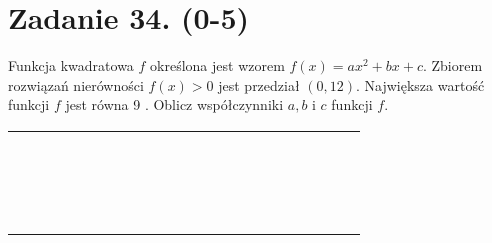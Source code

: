 \documentclass[10pt]{article}
\begin{document}
\section*{Zadanie 34. (0-5)}
Funkcja kwadratowa \(f\) określona jest wzorem \(f(x)=a x^{2}+b x+c\). Zbiorem rozwiązań nierówności \(f(x)>0\) jest przedział \((0,12)\). Największa wartość funkcji \(f\) jest równa 9 . Oblicz współczynniki \(a, b\) i \(c\) funkcji \(f\).

\begin{center}
\begin{tabular}{|c|c|c|c|c|c|c|c|c|c|c|c|c|c|c|c|c|c|c|c|c|c|}
\hline
 &  &  &  &  &  &  &  &  &  &  &  &  &  &  &  &  &  &  &  &  &  \\
\hline
 &  &  &  &  &  &  &  &  &  &  &  &  &  &  &  &  &  &  &  &  &  \\
\hline
 &  &  &  &  &  &  &  &  &  &  &  &  &  &  &  &  &  &  &  &  &  \\
\hline
 &  &  &  &  &  &  &  &  &  &  &  &  &  &  &  &  &  &  &  &  &  \\
\hline
 &  &  &  &  &  &  &  &  &  &  &  &  &  &  &  &  &  &  &  &  &  \\
\hline
 &  &  &  &  &  &  &  &  &  &  &  &  &  &  &  &  &  &  &  &  &  \\
\hline
 &  &  &  &  &  &  &  &  &  &  &  &  &  &  &  &  &  &  &  &  &  \\
\hline
 &  &  &  &  &  &  &  &  &  &  &  &  &  &  &  &  &  &  &  &  &  \\
\hline
 &  &  &  &  &  &  &  &  &  &  &  &  &  &  &  &  &  &  &  &  &  \\
\hline
 &  &  &  &  &  &  &  &  &  &  &  &  &  &  &  &  &  &  &  &  &  \\
\hline
 &  &  &  &  &  &  &  &  &  &  &  &  &  &  &  &  &  &  &  &  &  \\
\hline
 &  &  &  &  &  &  &  &  &  &  &  &  &  &  &  &  &  &  &  &  &  \\
\hline
 &  &  &  &  &  &  &  &  &  &  &  &  &  &  &  &  &  &  &  &  &  \\
\hline
 &  &  &  &  &  &  &  &  &  &  &  &  &  &  &  &  &  &  &  &  &  \\
\hline
 &  &  &  &  &  &  &  &  &  &  &  &  &  &  &  &  &  &  &  &  &  \\
\hline
 &  &  &  &  &  &  &  &  &  &  &  &  &  &  &  &  &  &  &  &  &  \\
\hline
 &  &  &  &  &  &  &  &  &  &  &  &  &  &  &  &  &  &  &  &  &  \\
\hline
 &  &  &  &  &  &  &  &  &  &  &  &  &  &  &  &  &  &  &  &  &  \\

\end{tabular}
\end{center}
\end{document}
